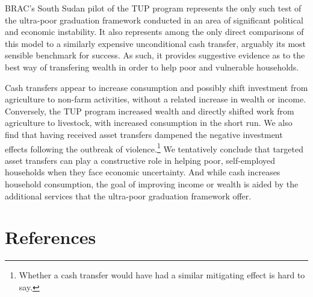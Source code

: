\documentclass[12pt,article]{article}
\begin{document}
BRAC's South Sudan pilot of the TUP program represents the only such test of the
ultra-poor graduation framework conducted in an area of significant political and
economic instability. It also represents among the only direct comparisons of this
model to a similarly expensive unconditional cash transfer, arguably its most
sensible benchmark for success. As such, it provides suggestive evidence as to the
best way of transfering wealth in order to help poor and vulnerable households.

Cash transfers appear to increase consumption and possibly shift investment from
agriculture to non-farm activities, without a related increase in wealth or income.
Conversely, the TUP program increased wealth and directly shifted work from
agriculture to livestock, with increased consumption in the short run. We also find
that having received asset transfers dampened the negative investment effects
following the outbreak of violence.\footnote{Whether a cash transfer would have had a
similar mitigating effect is hard to say.} We tentatively conclude that targeted
asset transfers can play a constructive role in helping poor, self-employed
households when they face economic uncertainty. And while cash increases household
consumption, the goal of improving income or wealth is aided by the additional
services that the ultra-poor graduation framework offer.


\section*{References}
\label{sec-5}
\renewcommand{\refname}{}
\printbibliography
\end{document}
